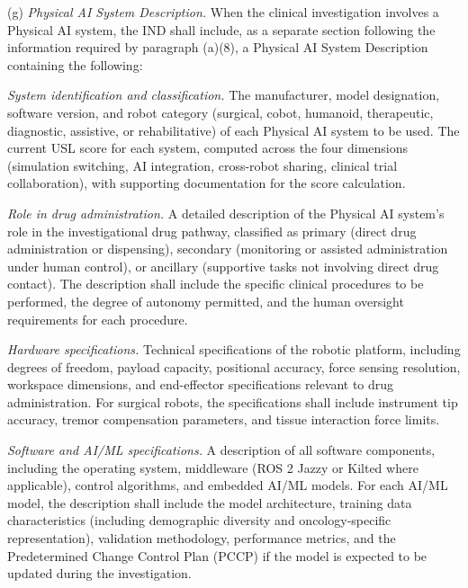 \documentclass[11pt]{article}
\begin{document}
(g) \textit{Physical AI System Description.} When the clinical investigation involves a Physical AI system, the IND shall include, as a separate section following the information required by paragraph (a)(8), a Physical AI System Description containing the following:

\begin{description}[leftmargin=0.8cm,style=sameline]
\item[(i)] \textit{System identification and classification.} The manufacturer, model designation, software version, and robot category (surgical, cobot, humanoid, therapeutic, diagnostic, assistive, or rehabilitative) of each Physical AI system to be used. The current USL score for each system, computed across the four dimensions (simulation switching, AI integration, cross-robot sharing, clinical trial collaboration), with supporting documentation for the score calculation.

\item[(ii)] \textit{Role in drug administration.} A detailed description of the Physical AI system's role in the investigational drug pathway, classified as primary (direct drug administration or dispensing), secondary (monitoring or assisted administration under human control), or ancillary (supportive tasks not involving direct drug contact). The description shall include the specific clinical procedures to be performed, the degree of autonomy permitted, and the human oversight requirements for each procedure.

\item[(iii)] \textit{Hardware specifications.} Technical specifications of the robotic platform, including degrees of freedom, payload capacity, positional accuracy, force sensing resolution, workspace dimensions, and end-effector specifications relevant to drug administration. For surgical robots, the specifications shall include instrument tip accuracy, tremor compensation parameters, and tissue interaction force limits.

\item[(iv)] \textit{Software and AI/ML specifications.} A description of all software components, including the operating system, middleware (ROS 2 Jazzy or Kilted where applicable), control algorithms, and embedded AI/ML models. For each AI/ML model, the description shall include the model architecture, training data characteristics (including demographic diversity and oncology-specific representation), validation methodology, performance metrics, and the Predetermined Change Control Plan (PCCP) if the model is expected to be updated during the investigation.


\end{description}
\end{document}
